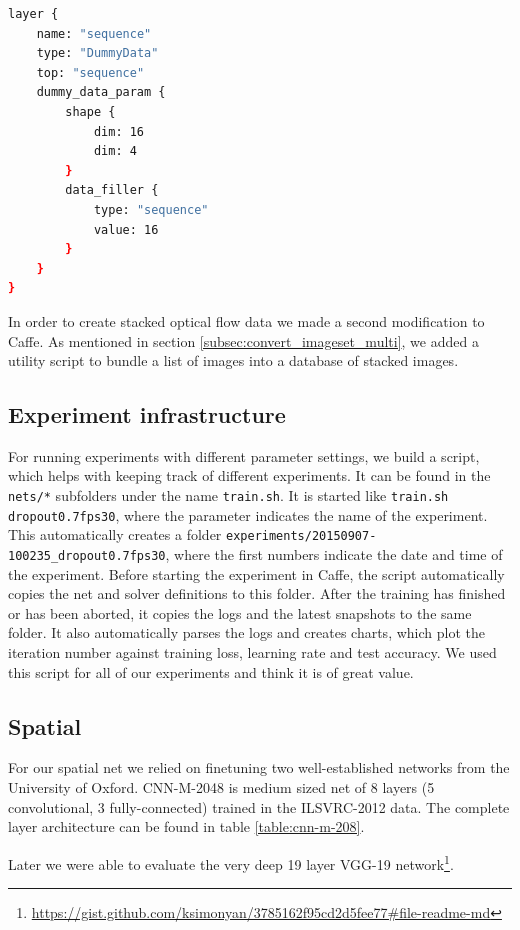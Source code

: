 \begin{lstlisting}[language=sh, caption=Sequence Layer, label=lst:seq-layer]
layer {
	name: "sequence"
	type: "DummyData"
	top: "sequence"
	dummy_data_param {
		shape {
			dim: 16
			dim: 4
		}
		data_filler {
			type: "sequence"
			value: 16
		}
	}
}
\end{lstlisting}

In order to create stacked optical flow data we made a second modification to Caffe.
As mentioned in section \ref{subsec:convert_imageset_multi}, we added a utility script to bundle a list of images into a database of stacked images.

\subsection{Experiment infrastructure}
For running experiments with different parameter settings, we build a script, which helps with keeping track of different experiments.
It can be found in the \texttt{nets/*} subfolders under the name \texttt{train.sh}.
It is started like \texttt{train.sh dropout0.7fps30}, where the parameter indicates the name of the experiment.
This automatically creates a folder \texttt{experiments/20150907-100235\_dropout0.7fps30}, where the first numbers indicate the date and time of the experiment.
Before starting the experiment in Caffe, the script automatically copies the net and solver definitions to this folder.
After the training has finished or has been aborted, it copies the logs and the latest snapshots to the same folder.
It also automatically parses the logs and creates charts, which plot the iteration number against training loss, learning rate and test accuracy.
We used this script for all of our experiments and think it is of great value.

\subsection{Spatial}
\label{subsec:spatial}
For our spatial net we relied on finetuning two well-established networks from the University of Oxford. 
CNN-M-2048 \cite{chatfield2014return} is medium sized net of 8 layers (5 convolutional, 3 fully-connected) trained in the ILSVRC-2012 data. The complete layer architecture can be found in table \ref{table:cnn-m-208}.

Later we were able to evaluate the very deep 19 layer VGG-19 \cite{simonyan2014very} network\footnote{\url{https://gist.github.com/ksimonyan/3785162f95cd2d5fee77\#file-readme-md}}. 

